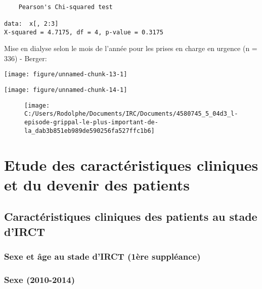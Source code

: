 \documentclass[11pt,a4paper]{article}\usepackage[]{graphicx}\usepackage[]{color}
\makeatletter
\def\maxwidth{ %
  \ifdim\Gin@nat@width>\linewidth
    \linewidth
  \else
    \Gin@nat@width
  \fi
}
\newenvironment{kframe}{%
 \def\at@end@of@kframe{}%
 \ifinner\ifhmode%
  \def\at@end@of@kframe{\end{minipage}}%
  \begin{minipage}{\columnwidth}%
 \fi\fi%
 \def\FrameCommand##1{\hskip\@totalleftmargin \hskip-\fboxsep
 \colorbox{shadecolor}{##1}\hskip-\fboxsep
     \hskip-\linewidth \hskip-\@totalleftmargin \hskip\columnwidth}%
 \MakeFramed {\advance\hsize-\width
   \@totalleftmargin\z@ \linewidth\hsize
   \@setminipage}}%
 {\par\unskip\endMakeFramed%
 \at@end@of@kframe}
\newenvironment{knitrout}{}{} %
\makeatother
\begin{document}
\begin{knitrout}
\color{fgcolor}\begin{kframe}
\begin{verbatim}

	Pearson's Chi-squared test

data:  x[, 2:3]
X-squared = 4.7175, df = 4, p-value = 0.3175
\end{verbatim}
\end{kframe}
\end{knitrout}



Mise en dialyse selon le mois de l'année pour les prises en charge en urgence (n = 336) - Berger:

\begin{knitrout}
\color{fgcolor}
\texttt{[image: figure/unnamed-chunk-13-1]} 

\end{knitrout}

\begin{knitrout}
\color{fgcolor}
\texttt{[image: figure/unnamed-chunk-14-1]} 

\end{knitrout}

\begin{figure}[H]
	\centering
	\texttt{[image: C:/Users/Rodolphe/Documents/IRC/Documents/4580745\_5\_04d3\_l-episode-grippal-le-plus-important-de-la\_dab3b851eb989de590256fa527ffc1b6]}
\end{figure}

\section{Etude des caractéristiques cliniques et du devenir des patients}

  \subsection{Caractéristiques cliniques des patients au stade d’IRCT}
  
    \subsubsection{Sexe et âge au stade d’IRCT (1ère suppléance)}

\subsubsection*{Sexe (2010-2014)}
\end{document}
